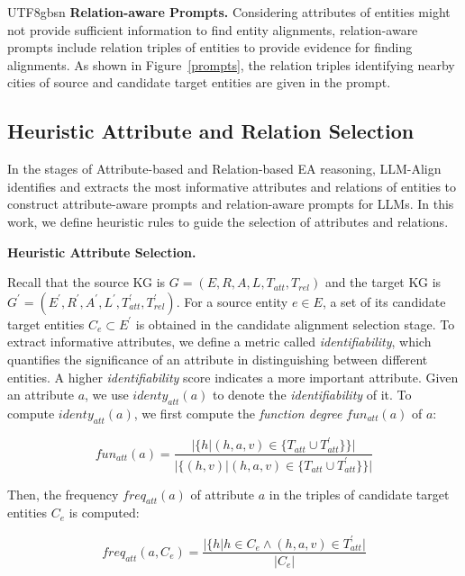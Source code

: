 \documentclass[preprint,12pt]{elsarticle}
\begin{document}
\begin{CJK}{UTF8}{gbsn}
\textbf{Relation-aware Prompts.}
\label{sec:Relation-aware Instructions}
Considering attributes of entities might not provide sufficient information to find entity alignments, relation-aware prompts include relation triples of entities to provide evidence for finding alignments. As shown in Figure~\ref{prompts}, the relation triples identifying nearby cities of source and candidate target entities are given in the prompt.

\subsection{Heuristic Attribute and Relation Selection}
In the stages of Attribute-based and Relation-based EA reasoning, LLM-Align identifies and extracts the most informative attributes and relations of entities to construct attribute-aware prompts and relation-aware prompts for LLMs. In this work, we define heuristic rules to guide the selection of attributes and relations. 

\noindent\textbf{Heuristic Attribute Selection. }

Recall that the source KG is $G = (E,R,A,L,T_{att},T_{rel})$ and the target KG is $G^{\prime} = (E^{\prime}, R^{\prime}, A^{\prime},L^{\prime}, T_{att}^{\prime}, T_{rel}^{\prime})$. For a source entity $e\in E$, a set of its candidate target entities $C_e\subset E^{\prime}$ is obtained in the candidate alignment selection stage. To extract informative attributes, we define a metric called \textit{identifiability}, which quantifies the significance of an attribute in distinguishing between different entities. A higher \textit{identifiability} score indicates a more important attribute. Given an attribute $a$, we use $identy_{att}(a)$ to denote the \textit{identifiability} of it. To compute $identy_{att}(a)$, we first compute the \textit{function degree} $fun_{att}(a)$ of $a$:

\begin{equation}
\label{eq:F}
fun_{att}(a)=\frac{|\{h|(h,a,v)\in \{T_{att} \cup T_{att}^{\prime}\}\}|}{|\{(h,v)|(h,a,v)\in \{T_{att} \cup T_{att}^{\prime}\}\}|}%
\end{equation}

Then, the frequency $freq_{att}(a)$ of attribute $a$ in the triples of candidate target entities $C_e$ is computed:

\begin{equation}
\label{eq:I}
    freq_{att}(a,C_e)=\frac{|\{h|h\in C_e \land (h,a,v)\in T_{att}^{\prime}|}{|C_e|}%
\end{equation}


\end{CJK}
\end{document}
